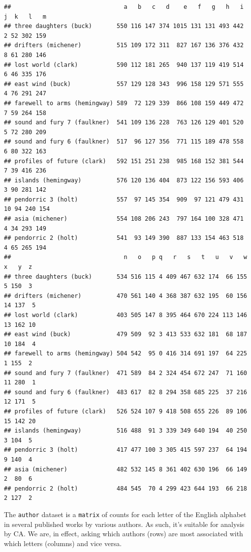 \documentclass[
]{book}
\begin{document}
\begin{verbatim}
##                                a   b   c   d    e   f   g   h   i  j  k   l   m
## three daughters (buck)       550 116 147 374 1015 131 131 493 442  2 52 302 159
## drifters (michener)          515 109 172 311  827 167 136 376 432  8 61 280 146
## lost world (clark)           590 112 181 265  940 137 119 419 514  6 46 335 176
## east wind (buck)             557 129 128 343  996 158 129 571 555  4 76 291 247
## farewell to arms (hemingway) 589  72 129 339  866 108 159 449 472  7 59 264 158
## sound and fury 7 (faulkner)  541 109 136 228  763 126 129 401 520  5 72 280 209
## sound and fury 6 (faulkner)  517  96 127 356  771 115 189 478 558  6 80 322 163
## profiles of future (clark)   592 151 251 238  985 168 152 381 544  7 39 416 236
## islands (hemingway)          576 120 136 404  873 122 156 593 406  3 90 281 142
## pendorric 3 (holt)           557  97 145 354  909  97 121 479 431 10 94 240 154
## asia (michener)              554 108 206 243  797 164 100 328 471  4 34 293 149
## pendorric 2 (holt)           541  93 149 390  887 133 154 463 518  4 65 265 194
##                                n   o   p q   r   s   t   u   v   w  x   y  z
## three daughters (buck)       534 516 115 4 409 467 632 174  66 155  5 150  3
## drifters (michener)          470 561 140 4 368 387 632 195  60 156 14 137  5
## lost world (clark)           403 505 147 8 395 464 670 224 113 146 13 162 10
## east wind (buck)             479 509  92 3 413 533 632 181  68 187 10 184  4
## farewell to arms (hemingway) 504 542  95 0 416 314 691 197  64 225  1 155  2
## sound and fury 7 (faulkner)  471 589  84 2 324 454 672 247  71 160 11 280  1
## sound and fury 6 (faulkner)  483 617  82 8 294 358 685 225  37 216 12 171  5
## profiles of future (clark)   526 524 107 9 418 508 655 226  89 106 15 142 20
## islands (hemingway)          516 488  91 3 339 349 640 194  40 250  3 104  5
## pendorric 3 (holt)           417 477 100 3 305 415 597 237  64 194  9 140  4
## asia (michener)              482 532 145 8 361 402 630 196  66 149  2  80  6
## pendorric 2 (holt)           484 545  70 4 299 423 644 193  66 218  2 127  2
\end{verbatim}

The \texttt{author} dataset is a \texttt{matrix} of counts for each letter of the English alphabet in several published works by various authors. As such, it's suitable for analysis by CA. We are, in effect, asking which authors (rows) are most associated with which letters (columns) and vice versa.
\end{document}
